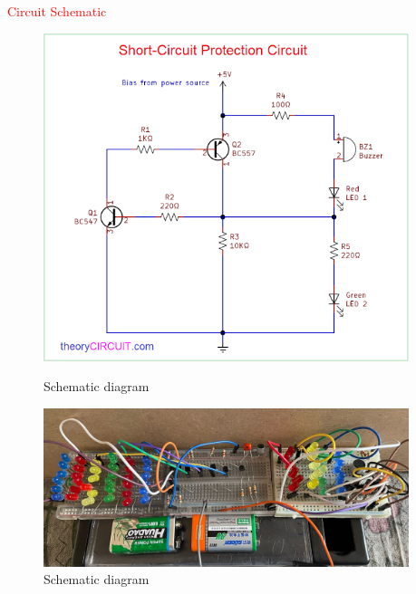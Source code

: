 \documentclass[final]{beamer}
\newlength{\sepwid}
\newlength{\onecolwid}
\newlength{\twocolwid}
\begin{document}
\begin{frame}[t]
\begin{columns}[t]
\begin{column}{\onecolwid}
\vskip10ex
\end{column}

\begin{column}{\sepwid}\end{column} %
\begin{column}{\twocolwid} %
\begin{block}{\textcolor{red}{Circuit Schematic}}
\begin{figure}
  
  \includegraphics[scale=1.1]{jamal.png}
  \caption{Schematic diagram}
  \label{fig:image1}
 \vspace{3cm}
   \includegraphics[scale=1.1]{PIC1.png}
  \caption{Schematic diagram}
  \label{fig:image1}
\end{figure}
\end{block}
\end{column}


\end{columns}
\end{frame}
\end{document}
